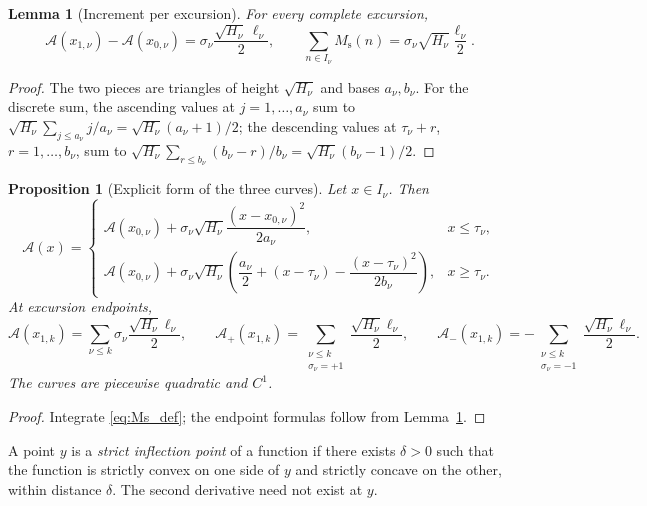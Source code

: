 \documentclass[11pt]{amsart}
\numberwithin{equation}{section}
\theoremstyle{plain}
\newtheorem{proposition}[theorem]{Proposition}
\newtheorem{lemma}[theorem]{Lemma}
\theoremstyle{definition}
\theoremstyle{remark}
\newcommand{\Ms}{M_{\mathrm{s}}}
\newcommand{\Ap}{\mathcal{A}_{+}}
\newcommand{\Am}{\mathcal{A}_{-}}
\newcommand{\Anet}{\mathcal{A}}
\begin{document}
\begin{lemma}[Increment per excursion]
\label{lem:jump}
For every complete excursion,
\begin{equation}
\label{eq:jump}
\Anet(x_{1,\nu})-\Anet(x_{0,\nu})
=\sigma_\nu\frac{\sqrt{H_\nu}\,\ell_\nu}{2},
\qquad
\sum_{n\in I_\nu}\Ms(n)
=\sigma_\nu\sqrt{H_\nu}\frac{\ell_\nu}{2}.
\end{equation}
\end{lemma}

\begin{proof}
The two pieces are triangles of height $\sqrt{H_\nu}$ and bases $a_\nu,b_\nu$.
For the discrete sum, the ascending values at $j=1,\ldots,a_\nu$ sum to
$\sqrt{H_\nu}\sum_{j\le a_\nu}j/a_\nu=\sqrt{H_\nu}(a_\nu+1)/2$; the
descending values at $\tau_\nu+r$, $r=1,\ldots,b_\nu$, sum to
$\sqrt{H_\nu}\sum_{r\le b_\nu}(b_\nu-r)/b_\nu=\sqrt{H_\nu}(b_\nu-1)/2$.
\end{proof}

\begin{proposition}[Explicit form of the three curves]
\label{prop:explicit}
Let $x\in I_\nu$. Then
\begin{equation}
\label{eq:explicit_A}
\Anet(x)=
\begin{cases}
\Anet(x_{0,\nu})+\sigma_\nu\sqrt{H_\nu}
\dfrac{(x-x_{0,\nu})^2}{2a_\nu},&x\le\tau_\nu,\\[2ex]
\Anet(x_{0,\nu})+\sigma_\nu\sqrt{H_\nu}
\left(\dfrac{a_\nu}{2}+(x-\tau_\nu)-
\dfrac{(x-\tau_\nu)^2}{2b_\nu}\right),&x\ge\tau_\nu.
\end{cases}
\end{equation}
At excursion endpoints,
\begin{equation}
\label{eq:explicit_net}
\Anet(x_{1,k})=\sum_{\nu\le k}\sigma_\nu\frac{\sqrt{H_\nu}\ell_\nu}{2},\qquad
\Ap(x_{1,k})=\sum_{\substack{\nu\le k\\\sigma_\nu=+1}}
\frac{\sqrt{H_\nu}\ell_\nu}{2},\qquad
\Am(x_{1,k})=-\sum_{\substack{\nu\le k\\\sigma_\nu=-1}}
\frac{\sqrt{H_\nu}\ell_\nu}{2}.
\end{equation}
The curves are piecewise quadratic and $C^1$.
\end{proposition}

\begin{proof}
Integrate \eqref{eq:Ms_def}; the endpoint formulas follow from
Lemma~\ref{lem:jump}.
\end{proof}

A point $y$ is a \emph{strict inflection point} of a function if there
exists $\delta>0$ such that the function is strictly convex on one side of
$y$ and strictly concave on the other, within distance $\delta$. The second
derivative need not exist at $y$.
\end{document}
